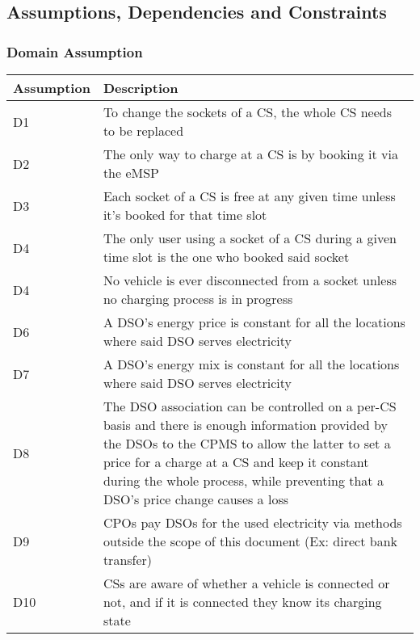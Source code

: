 \documentclass[11pt]{article}
\begin{document}
\subsection{Assumptions, Dependencies and Constraints}

\subsubsection{Domain Assumption}

\begin{table}[H]
    \centering
    \setlength{\tabcolsep}{18pt}
    \renewcommand{\arraystretch}{1.2}
    \begin{tabularx}{\textwidth}{|>{\centering\hsize=0.3\hsize}X|>{\hsize=1.7\hsize}X|}
        \hline
        \textbf{Assumption} & \textbf{Description} \\
        \hline
        D1 & To change the sockets of a CS, the whole CS needs to be replaced \\
        \hline
        D2 & The only way to charge at a CS is by booking it via the eMSP \\
        \hline
        D3 & Each socket of a CS is free at any given time unless it's booked for that time slot \\
        \hline
        D4 & The only user using a socket of a CS during a given time slot is the one who booked said socket \\
        \hline
        D4 & No vehicle is ever disconnected from a socket unless no charging process is in progress \\
        \hline
        D6 & A DSO's energy price is constant for all the locations where said DSO serves electricity \\
        \hline
        D7 & A DSO's energy mix is constant for all the locations where said DSO serves electricity \\
        \hline
        D8 & The DSO association can be controlled on a per-CS basis and there is enough information provided by the DSOs to the CPMS to allow the latter to set a price for a charge at a CS and keep it constant during the whole process, while preventing that a DSO's price change causes a loss \\
        \hline
        D9 & CPOs pay DSOs for the used electricity via methods outside the scope of this document (Ex: direct bank transfer) \\
        \hline
        D10 & CSs are aware of whether a vehicle is connected or not, and if it is connected they know its charging state \\
        \hline
    \end{tabularx}
    \label{tab:domain_assumptions}
\end{table}
\end{document}
